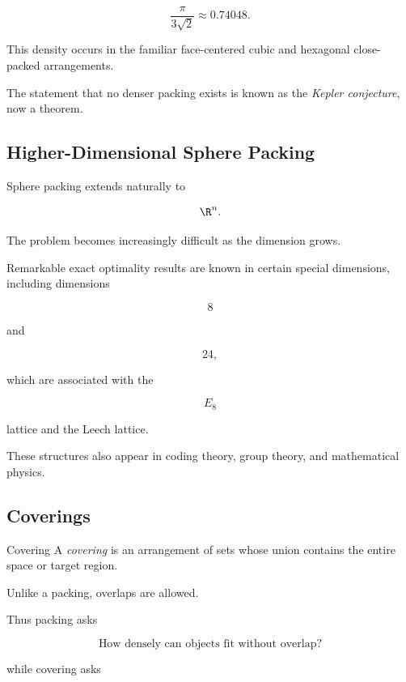 \[
\boxed{
\frac{\pi}{3\sqrt2}
\approx0.74048.
}
\]

This density occurs in the familiar face-centered cubic and hexagonal
close-packed arrangements.

The statement that no denser packing exists is known as the
\emph{Kepler conjecture}, now a theorem.

\subsection{Higher-Dimensional Sphere Packing}
\label{subsec:higher-dimensional-sphere-packing}

Sphere packing extends naturally to

\[
\R^n.
\]

The problem becomes increasingly difficult as the dimension grows.

Remarkable exact optimality results are known in certain special dimensions,
including dimensions

\[
8
\]

and

\[
24,
\]

which are associated with the

\[
E_8
\]

lattice and the Leech lattice.

These structures also appear in coding theory, group theory, and mathematical
physics.

\subsection{Coverings}
\label{subsec:geometric-coverings}

\begin{definitionbox}{Covering}
A \emph{covering} is an arrangement of sets whose union contains the entire
space or target region.
\end{definitionbox}

Unlike a packing, overlaps are allowed.

Thus packing asks

\[
\boxed{
\text{How densely can objects fit without overlap?}
}
\]

while covering asks

